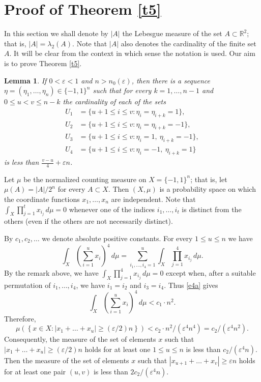 \documentclass[12pt]{article}
\newtheorem{lemma}[theorem]{Lemma}
\def\rr{{\mathbb R}}
\def\sik{{\rr}^2}
\def\su{\subset}
\def\ep{\varepsilon}
\def\la{\lambda}
\def\cd{\cdot}
\def\stb{,\ldots ,}
\def\proof{\noindent {\bf Proof.} }
\begin{document}
\section{Proof of Theorem \ref{t5}}\label{s4}
In this section we shall denote by $|A|$ the Lebesgue measure of the set
$A\su \sik$; that is, $|A|=\la _2 (A)$. Note that $|A|$ also denotes the
cardinality of the finite set $A$. It will be clear from the context 
in which sense the notation is used. Our aim is to prove Theorem \ref{t5}.
\begin{lemma} \label{l6}
If $0<\ep <1$ and $n>n_0 (\ep )$, then there is a sequence $\eta =
(\eta _1 \stb \eta _n )\in \{ -1,1\} ^n$ such that for every $k=1\stb n-1$ and
$0\le u<v\le n-k$ the cardinality of each of the sets
\begin{equation}\label{e3}
\begin{split}  
U_1 &=\{ u+1\le i \le v \colon \eta _i =\eta _{i+k} =1\} ,\\
U_2 &=\{ u+1\le i \le v \colon \eta _i =\eta _{i+k} =-1\},\\
U_3 &=\{ u+1\le i \le v \colon \eta _i =1, \ \eta_{i+k} =-1\},\\
U_4 &=\{ u+1\le i \le v \colon \eta _i =-1, \ \eta _{i+k} =1\}
\end{split}
\end{equation}
is less than $\tfrac{v-u}{4} +\ep n$.
\end{lemma}
\proof 
Let $\mu$ be the normalized counting measure on $X= \{ -1,1\} ^n$; that is, let
$\mu (A)=|A|/2^n$ for every $A\su X$. Then $(X,\mu )$ is a probability space
on which the coordinate functions $x_1 \stb x_n$ are independent.
Note that $\int_X \prod_{j=1}^t x_{i_j} \, d\mu =0$ whenever one of the indices
$i_1 \stb i_t$ is distinct from the others (even if the others are not
necessarily distinct).

By $c_1 ,c_2 ,\ldots$ we denote absolute positive constants.
For every $1\le u\le n$ we have
\begin{equation} \label{e4a}
\int_X \left( \sum_{i=1}^{u} x_{i} \right) ^4 \, d\mu =
\sum_{i_1 \stb i_4 =1}^{u} \int_X \prod_{j=1}^4 x_{i_j}  \, d\mu .
\end{equation} 
By the remark above, we have $\int_X \prod_{j=1}^4 x_{i_j} \, d\mu =0$
except when, after a suitable permutation of $i_1 \stb i_4$, we have $i_1 =i_2$
and $i_3 =i_4$. Thus \eqref{e4a} gives
$$\int_X \left( \sum_{i=1}^{u} x_{i} \right) ^4 \, d\mu <c_1 \cd n^2 .$$
Therefore,
$$\mu \left( \left\{ x\in X\colon |x_1 +\ldots +x_u |
\ge (\ep /2) n \right \}\right) <c_2 \cd n^2 /(\ep ^4 n^4 )=c_2 /(\ep ^4 n^2 ).$$
Consequently, the measure of the set of elements $x$ such that
$|x_1 +\ldots +x_u | \ge (\ep /2) n$ holds for at least one $1\le u\le n$ is
less than $c_2 /(\ep ^4 n )$. Then the measure of the set of elements $x$ such
that $|x_{u+1} +\ldots +x_v | \ge \ep n$ holds for at least one pair 
$(u,v)$ is less than $2c_2 /(\ep ^4 n )$.  
\end{document}
